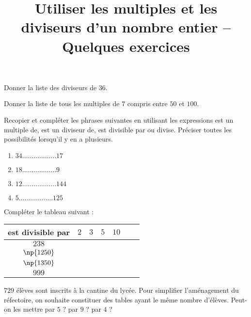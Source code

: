 \documentclass[a4paper]{article}
\begin{document}
\title{Utiliser les multiples et les diviseurs d'un nombre entier -- Quelques exercices}

\pagestyle{empty}

\date{}
\author{}

\maketitle{}

\exo Donner la liste des diviseurs de $36$.

\bigskip

\exo Donner la liste de tous les multiples de $7$ compris entre $50$ et $100$.

\bigskip

\exo Recopier et compléter les phrases suivantes en utilisant les expressions \og{}est un multiple de\fg{}, \og{}est un diviseur de\fg{}, \og{}est divisible par\fg{} ou \og{}divise\fg{}. Préciser toutes les possibilités lorsqu'il y en a plusieurs.

\begin{enumerate}
  \item $34\hdots\hdots\hdots\hdots\hdots\hdots 17$
  \item $18\hdots\hdots\hdots\hdots\hdots\hdots 9$
  \item $12\hdots\hdots\hdots\hdots\hdots\hdots 144$
  \item $5\hdots\hdots\hdots\hdots\hdots\hdots 125$
\end{enumerate}

\bigskip

\exo Compléter le tableau suivant :

\begin{center}
  \begin{tabular}{@{}ccccccc@{}}
    \toprule
    est divisible par & $2$ & $3$ & $5$ & $10$\\
    \midrule
    $238$ &&&&\\
    $\np{1250}$ &&&&\\
    $\np{1350}$ &&&&\\
    $999$ &&&&\\
    \bottomrule
  \end{tabular}
\end{center}

\bigskip

\exo $729$ élèves sont inscrits à la cantine du lycée. Pour simplifier l'aménagement du réfectoire, on souhaite constituer des tables ayant le même nombre d'élèves. Peut-on les mettre par $5$ ? par $9$ ? par $4$ ?
\end{document}
